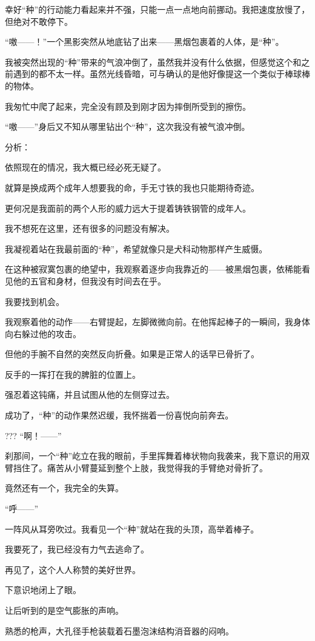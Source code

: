 幸好“种”的行动能力看起来并不强，只能一点一点地向前挪动。我把速度放慢了，但绝对不敢停下。

“嗷——！”一个黑影突然从地底钻了出来——黑烟包裹着的人体，是“种”。

我被突然出现的“种”带来的气浪冲倒了，虽然我并没有什么依据，但感觉这个和之前遇到的都不太一样。虽然光线昏暗，可与确认的是他好像提这一个类似于棒球棒的物体。

我匆忙中爬了起来，完全没有顾及到刚才因为摔倒所受到的擦伤。

“嗷——”身后又不知从哪里钻出个“种”，这次我没有被气浪冲倒。

分析：

依照现在的情况，我大概已经必死无疑了。

就算是换成两个成年人想要我的命，手无寸铁的我也只能期待奇迹。

更何况是我面前的两个人形的威力远大于提着铸铁钢管的成年人。

我不想死在这里，还有很多的问题没有解决。

我凝视着站在我最前面的“种”，希望就像只是犬科动物那样产生威慑。

在这种被寂寞包裹的绝望中，我观察着逐步向我靠近的——被黑烟包裹，依稀能看见他的五官和身材，但我没有时间去在乎。

我要找到机会。

我观察着他的动作——右臂提起，左脚微微向前。在他挥起棒子的一瞬间，我身体向右躲过他的攻击。

但他的手腕不自然的突然反向折叠。如果是正常人的话早已骨折了。

反手的一挥打在我的脾脏的位置上。

强忍着这钝痛，并且试图从他的左侧穿过去。

成功了，“种”的动作果然迟缓，我怀揣着一份喜悦向前奔去。

??? “啊！——”

刹那间，一个“种”屹立在我的眼前，手里挥舞着棒状物向我袭来，我下意识的用双臂挡住了。痛苦从小臂蔓延到整个上肢，我觉得我的手臂绝对骨折了。

竟然还有一个，我完全的失算。

“呼——”

一阵风从耳旁吹过。我看见一个“种”就站在我的头顶，高举着棒子。

我要死了，我已经没有力气去逃命了。

再见了，这个人人称赞的美好世界。

下意识地闭上了眼。

让后听到的是空气膨胀的声响。

熟悉的枪声，大孔径手枪装载着石墨泡沫结构消音器的闷响。

